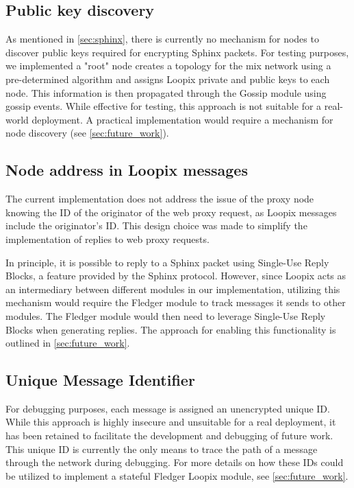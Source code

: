 \documentclass[a4paper,11pt,oneside]{report}
\begin{document}
\subsection{Public key discovery}
As mentioned in \autoref{sec:sphinx}, there is currently no mechanism for nodes to discover public keys required for encrypting Sphinx packets. For testing purposes, we implemented a "root" node creates a topology for the mix network using a pre-determined algorithm and assigns Loopix private and public keys to each node. This information is then propagated through the Gossip module using gossip events. While effective for testing, this approach is not suitable for a real-world deployment. A practical implementation would require a mechanism for node discovery (see \autoref{sec:future_work}).

\subsection{Node address in Loopix messages}

The current implementation does not address the issue of the proxy node knowing the ID of the originator of the web proxy request, as Loopix messages include the originator's ID. This design choice was made to simplify the implementation of replies to web proxy requests.

In principle, it is possible to reply to a Sphinx packet using Single-Use Reply Blocks, a feature provided by the Sphinx protocol. However, since Loopix acts as an intermediary between different modules in our implementation, utilizing this mechanism would require the Fledger module to track messages it sends to other modules. The Fledger module would then need to leverage Single-Use Reply Blocks when generating replies. The approach for enabling this functionality is outlined in \autoref{sec:future_work}.

\subsection{Unique Message Identifier}
For debugging purposes, each message is assigned an unencrypted unique ID. While this approach is highly insecure and unsuitable for a real deployment, it has been retained to facilitate the development and debugging of future work. This unique ID is currently the only means to trace the path of a message through the network during debugging. For more details on how these IDs could be utilized to implement a stateful Fledger Loopix module, see \autoref{sec:future_work}.
\end{document}
